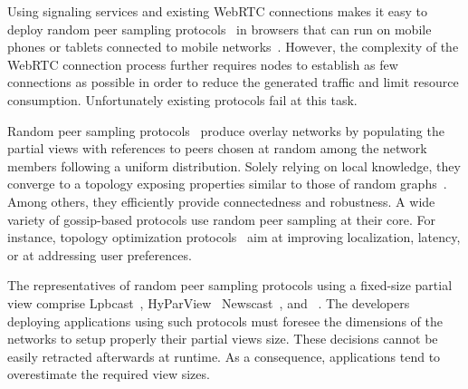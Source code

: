 
Using signaling services and existing WebRTC connections makes it easy
to deploy random peer sampling protocols~\cite{jelasity2004peer} in
browsers that can run on mobile phones or tablets connected to mobile
networks~\cite{Carvajal-Gómez2015}. However, the complexity of the
WebRTC connection process further requires nodes to establish as few
connections as possible in order to reduce the generated traffic and
limit resource consumption. Unfortunately existing protocols fail at
this task.

Random peer sampling protocols~\cite{jelasity2004peer,jelasity2007gossip}
produce overlay networks by populating the partial views with references to
peers chosen at random among the network members following a uniform
distribution. Solely relying on local knowledge, they converge to a topology
exposing properties similar to those of random
graphs~\cite{erdos1959random}. Among others, they efficiently provide
connectedness and robustness. A wide variety of gossip-based protocols use
random peer sampling at their core. For instance, topology optimization
protocols~\cite{voulgaris2005epidemic,jelasity2009tman} aim at improving
localization, latency, or at addressing user preferences.

The representatives of random peer sampling protocols using a
fixed-size partial view comprise
Lpbcast~\cite{eugster2003lightweight},
HyParView~\cite{leitao2007hyparview}
Newscast~\cite{tolgyeski2009adaptive}, and
\CYCLON~\cite{voulgaris2005cyclon}. The developers deploying
applications using such protocols must foresee the dimensions of the
networks to setup properly their partial views size. These decisions
cannot be easily retracted afterwards at runtime. As a consequence,
applications tend to overestimate the required view sizes.

